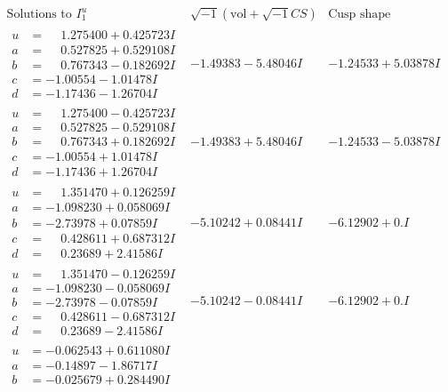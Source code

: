 \documentclass[1p]{elsarticle_modified}
\theoremstyle{definition}
\newcommand{\I}{\sqrt{-1}}
\begin{document}
$$\begin{array}{c|c|c}
\text{Solutions to }I^u_{1}& \I (\text{vol} + \sqrt{-1}CS) & \text{Cusp shape}\\
 \hline 
\begin{aligned}
u &= \phantom{-}1.275400 + 0.425723 I \\
a &= \phantom{-}0.527825 + 0.529108 I \\
b &= \phantom{-}0.767343 - 0.182692 I \\
c &= -1.00554 - 1.01478 I \\
d &= -1.17436 - 1.26704 I\end{aligned}
 & -1.49383 - 5.48046 I & -1.24533 + 5.03878 I \\ \hline\begin{aligned}
u &= \phantom{-}1.275400 - 0.425723 I \\
a &= \phantom{-}0.527825 - 0.529108 I \\
b &= \phantom{-}0.767343 + 0.182692 I \\
c &= -1.00554 + 1.01478 I \\
d &= -1.17436 + 1.26704 I\end{aligned}
 & -1.49383 + 5.48046 I & -1.24533 - 5.03878 I \\ \hline\begin{aligned}
u &= \phantom{-}1.351470 + 0.126259 I \\
a &= -1.098230 + 0.058069 I \\
b &= -2.73978 + 0.07859 I \\
c &= \phantom{-}0.428611 + 0.687312 I \\
d &= \phantom{-}0.23689 + 2.41586 I\end{aligned}
 & -5.10242 + 0.08441 I & -6.12902 + 0. I\phantom{ +0.000000I} \\ \hline\begin{aligned}
u &= \phantom{-}1.351470 - 0.126259 I \\
a &= -1.098230 - 0.058069 I \\
b &= -2.73978 - 0.07859 I \\
c &= \phantom{-}0.428611 - 0.687312 I \\
d &= \phantom{-}0.23689 - 2.41586 I\end{aligned}
 & -5.10242 - 0.08441 I & -6.12902 + 0. I\phantom{ +0.000000I} \\ \hline\begin{aligned}
u &= -0.062543 + 0.611080 I \\
a &= -0.14897 - 1.86717 I \\
b &= -0.025679 + 0.284490 I \\

\end{aligned}
\end{array}$$
\end{document}

